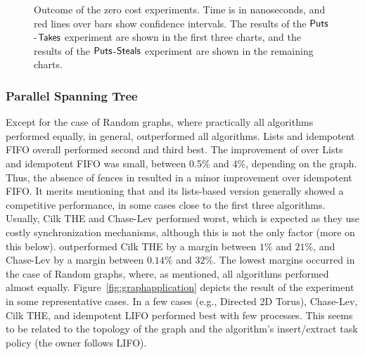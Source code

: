 \begin{figure}[!ht]
{  }

  \caption{\label{fig:zerocost} Outcome of the zero cost experiments. Time is in nanoseconds, and red lines over bars show confidence intervals. The results of the ${\sf Puts}$-${\sf Takes}$ experiment are shown in the first three charts, and the results of the ${\sf Puts}$-${\sf Steals}$ experiment are shown in the remaining charts.}

\end{figure}


\subsubsection{Parallel Spanning Tree}


Except for the case of Random graphs, where practically all algorithms performed equally, in general, \NCWSM{} outperformed all algorithms.  \NCWSM Lists and idempotent FIFO overall performed second and third best. The improvement of \NCWSM{} over \NCWSM Lists and idempotent FIFO was small, between 0.5\% and 4\%, depending on the graph. Thus, the absence of fences in \NCWSM{} resulted in a minor improvement over idempotent FIFO. It merits mentioning that \BNCWSM and its lists-based version generally showed a competitive performance, in some cases close to the first three algorithms. Usually, Cilk THE and Chase-Lev performed worst, which is expected as they use costly synchronization mechanisms, although this is not the only factor (more on this below).  \NCWSM outperformed Cilk THE by a margin between $1\%$ and $21\%$, and Chase-Lev by a margin between $0.14\%$ and $32\%$.  The lowest margins occurred in the case of Random graphs, where, as mentioned, all algorithms performed almost equally. Figure~\ref{fig:graphapplication} depicts the result of the experiment in some representative cases. In a few cases (e.g., Directed 2D Torus), Chase-Lev, Cilk THE, and idempotent LIFO performed best with few processes. This seems to be related to the topology of the graph and the algorithm's insert/extract task policy (the owner follows LIFO).

